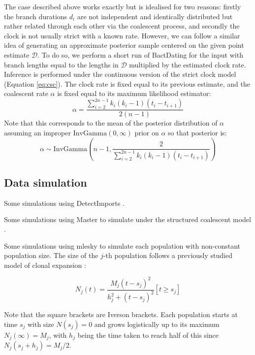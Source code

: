 \documentclass{article}
\begin{document}
The case described above works exactly but is idealised for two reasons:
firstly the branch durations $d_i$ are not independent and identically distributed
but rather related through each other via the coalescent process, and secondly
the clock is not usually strict with a known rate. However, we can follow
a similar idea of generating an approximate posterior sample centered on the given
point estimate $\mathcal{D}$. To do so, we perform a short run of BactDating \citep{Didelot2018}
for the input with branch lengths equal to
the lengths in $\mathcal{D}$ multiplied by the estimated clock rate.
Inference is performed under the 
continuous version of the strict clock model (Equation \ref{eq:csc}).  
The clock rate is fixed equal to its previous estimate, and the coalescent rate $\alpha$
is fixed equal to its maximum likelihood estimator:
\begin{equation}
\alpha = \frac{\sum_{i=2}^{2n-1}k_i (k_i-1)(t_i-t_{i+1})}{2(n-1)}
\end{equation}
Note that this corresponds to the mean of the posterior distribution of $\alpha$ 
assuming an improper $\mathrm{InvGamma}(0,\infty)$ prior on $\alpha$ so that posterior is:
\begin{equation}
\alpha \sim \mathrm{InvGamma}\left(n-1, \frac{2}{\sum_{i=2}^{2n-1}k_i (k_i-1)(t_i-t_{i+1})}\right)
\end{equation}

\subsection*{Data simulation}

Some simulations using DetectImports \citep{Didelot2022detectimports}.

Some simulations using Master \citep{Vaughan2013} to simulate under the structured coalescent model \citep{Nordborg1997}.

Some simulations using mlesky \citep{Didelot2023mlesky} to simulate each population with non-constant population size. The size of the $j$-th population follows a previously studied model of clonal expansion \citep{Helekal2021}:

\begin{equation}
N_j(t)=\frac{M_j(t-s_j)^2}{h_j^2+(t-s_j)^2}[t \geq s_j]
\end{equation}

Note that the square brackets are Iverson brackets. Each population starts at time $s_j$ with size $N(s_j)=0$ and grows logistically up to its maximum $N_j(\infty)=M_j$, with $h_j$ being the time taken to reach half of this since $N_j(s_j+h_j)=M_j/2$. 
\end{document}
